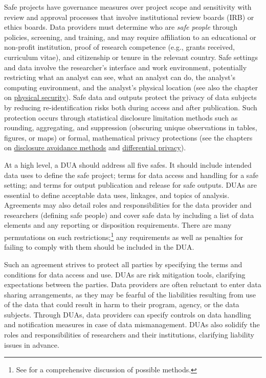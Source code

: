 Safe projects have governance measures over project scope and sensitivity with review and approval processes that involve institutional review boards (IRB) or ethics boards. Data providers must determine who are \emph{safe people} through policies, screening, and training, and may require affiliation to an educational or non-profit institution, proof of research competence (e.g., grants received, curriculum vitae), and citizenship or tenure in the relevant country. Safe settings and data involve the researcher's interface and work environment, potentially restricting what an analyst can see, what an analyst can do, the analyst's computing environment, and the analyst's physical location (see also the chapter on \protect\hyperlink{security}{physical security}). Safe data and outputs protect the privacy of data subjects by reducing re-identification risks both during access and after publication. Such protection occurs through statistical disclosure limitation methods such as rounding, aggregating, and suppression (obscuring unique observations in tables, figures, or maps) or formal, mathematical privacy protections (see the chapters on \protect\hyperlink{discavoid}{disclosure avoidance methods} and \protect\hyperlink{diffpriv}{differential privacy}).

At a high level, a DUA should address all five safes. It should include intended data uses to define the safe project; terms for data access and handling for a safe setting; and terms for output publication and release for safe outputs. DUAs are essential to define acceptable data uses, linkages, and topics of analysis. Agreements may also detail roles and responsibilities for the data provider and researchers (defining safe people) and cover safe data by including a list of data elements and any reporting or disposition requirements. There are many permutations on such restrictions;\footnote{See \citet{goroff2018} for a comprehensive discussion of possible methods.} any requirements as well as penalties for failing to comply with them should be included in the DUA.

Such an agreement strives to protect all parties by specifying the terms and conditions for data access and use. DUAs are risk mitigation tools, clarifying expectations between the parties. Data providers are often reluctant to enter data sharing arrangements, as they may be fearful of the liabilities resulting from use of the data that could result in harm to their program, agency, or the data subjects. Through DUAs, data providers can specify controls on data handling and notification measures in case of data mismanagement. DUAs also solidify the roles and responsibilities of researchers and their institutions, clarifying liability issues in advance.

